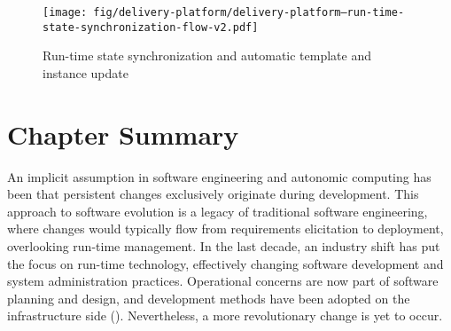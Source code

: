 

\begin{figure}[h]
	\hspace{-1.4cm}
	\texttt{[image: fig/delivery-platform/delivery-platform--run-time-state-synchronization-flow-v2.pdf]}
	\caption{Run-time state synchronization and automatic template and instance update}
	\label{fig:delivery-platform--run-time-state-synchronization-flow}
\end{figure}

\section{Chapter Summary}


An implicit assumption in software engineering and autonomic computing has been that persistent changes exclusively originate during development. This approach to software evolution is a legacy of traditional software engineering, where changes would typically flow from requirements elicitation to deployment, overlooking run-time management. In the last decade, an industry shift has put the focus on run-time technology, effectively changing software development and system administration practices. Operational concerns are now part of software planning and design, and development methods have been adopted on the infrastructure side (). Nevertheless, a more revolutionary change is yet to occur.

